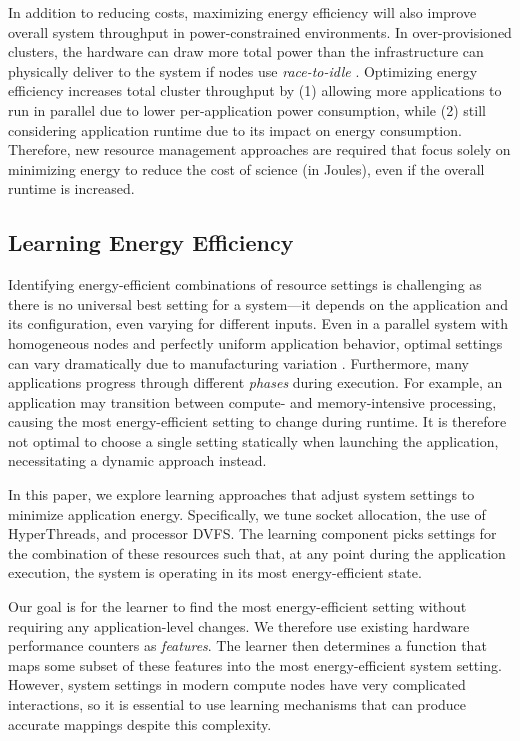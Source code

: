 In addition to reducing costs, maximizing energy efficiency will also improve overall system throughput in power-constrained environments.
In over-provisioned clusters, the hardware can draw more total power than the infrastructure can physically deliver to the system if nodes use \emph{race-to-idle} \cite{Sarood2013}.
Optimizing energy efficiency increases total cluster throughput by (1) allowing more applications to run in parallel due to lower per-application power consumption, while (2) still considering application runtime due to its impact on energy consumption.
Therefore, new resource management approaches are required that focus solely on minimizing energy to reduce the cost of science (in Joules), even if the overall runtime is increased.


\subsection{Learning Energy Efficiency}
\label{sec:challenges-learning}

Identifying energy-efficient combinations of resource settings is challenging as there is no universal best setting for a system---it depends on the application and its configuration, even varying for different inputs.
Even in a parallel system with homogeneous nodes and perfectly uniform application behavior, optimal settings can vary dramatically due to manufacturing variation \cite{Acun2016}.
Furthermore, many applications progress through different \emph{phases} during execution.
For example, an application may transition between compute- and memory-intensive processing, causing the most energy-efficient setting to change during runtime.
It is therefore not optimal to choose a single setting statically when launching the application, necessitating a dynamic approach instead.

In this paper, we explore learning approaches that adjust system settings to minimize application energy.
Specifically, we tune socket allocation, the use of HyperThreads, and processor DVFS.
The learning component picks settings for the combination of these resources such that, at any point during the application execution, the system is operating in its most energy-efficient state.

Our goal is for the learner to find the most energy-efficient setting without requiring any application-level changes.
We therefore use existing hardware performance counters as \emph{features}.
The learner then determines a function that maps some subset of these features into the most energy-efficient system setting.
However, system settings in modern compute nodes have very complicated interactions, so it is essential to use learning mechanisms that can produce accurate mappings despite this complexity.

